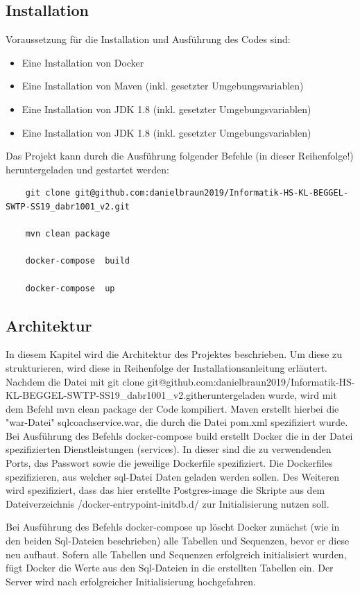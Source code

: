 \documentclass[fleqn,10pt,ngerman]{SelfArx}
\begin{document}
	\subsection{Installation}
	Voraussetzung für die Installation und Ausführung des Codes sind:
	\begin{itemize}
		\item Eine Installation von Docker 
		\item Eine Installation von Maven   (inkl. gesetzter Umgebungsvariablen)
		\item Eine Installation von JDK 1.8 (inkl. gesetzter  Umgebungsvariablen)  
		\item Eine Installation von JDK 1.8 (inkl. gesetzter  Umgebungsvariablen)  
	\end{itemize}
Das Projekt kann durch die Ausführung folgender Befehle (in dieser Reihenfolge!) heruntergeladen und gestartet werden:
	\begin{lstlisting}
	git clone git@github.com:danielbraun2019/Informatik-HS-KL-BEGGEL-SWTP-SS19_dabr1001_v2.git
	
	mvn clean package
	
	docker-compose  build 
	
	docker-compose  up
	\end{lstlisting}
	
		\subsection{Architektur}
		In diesem Kapitel wird die Architektur des Projektes beschrieben. Um diese zu strukturieren, wird diese in Reihenfolge der Installationsanleitung erläutert.
		Nachdem die Datei mit \dq git clone git@github.com:danielbraun2019/Informatik-HS-KL-BEGGEL-SWTP-SS19\_dabr1001\_v2.git\dq heruntergeladen wurde, wird mit dem Befehl mvn clean package der Code kompiliert. Maven erstellt hierbei die "war-Datei" sqlcoachservice.war, die durch die Datei pom.xml spezifiziert wurde. 
		Bei Ausführung des Befehls docker-compose build erstellt Docker die in der Datei spezifizierten Dienstleistungen (services). In dieser sind die zu verwendenden Ports, das Passwort sowie die jeweilige Dockerfile spezifiziert. Die Dockerfiles spezifizieren, aus welcher sql-Datei Daten geladen werden sollen. Des Weiteren wird spezifiziert, dass das hier erstellte Postgres-image die Skripte aus dem Dateiverzeichnis /docker-entrypoint-initdb.d/ zur Initialisierung nutzen soll.
		
		Bei Ausführung des Befehls docker-compose up löscht Docker zunächst (wie in den beiden Sql-Dateien beschrieben) alle Tabellen und Sequenzen, bevor er diese neu aufbaut. Sofern alle Tabellen und Sequenzen erfolgreich initialisiert wurden, fügt Docker die Werte aus den  Sql-Dateien in die erstellten Tabellen ein. Der Server wird nach erfolgreicher Initialisierung hochgefahren. 
		
\end{document}
